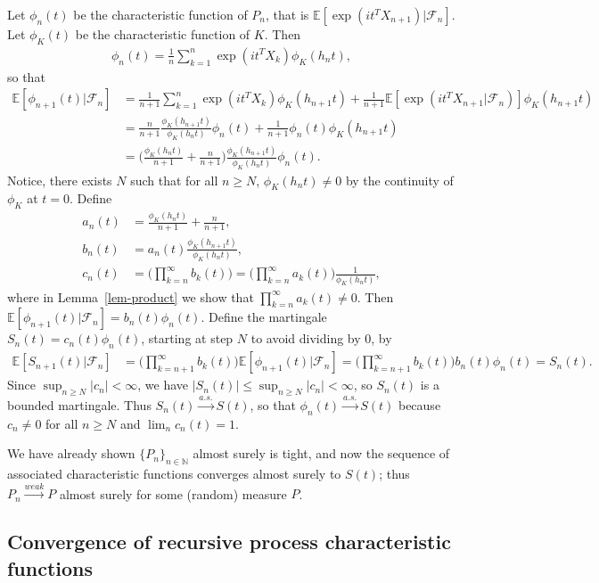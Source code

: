 \documentclass[12pt]{article}
\newcommand{\N}{\mathbb{N}}
\newcommand{\E}{\mathbb{E}}
\newcommand{\F}{\mathcal{F}}
\begin{document}
Let $\phi_n(t)$ be the characteristic function of $P_n$, that is $\E[\exp(it^TX_{n+1}) | \F_n]$. Let $\phi_K(t)$ be the characteristic function of $K$. Then
\begin{align*}
    \phi_n(t) = \frac{1}{n} \sum_{k = 1}^n \exp(it^T X_k) \phi_K(h_n t),
\end{align*}
so that
\begin{align*}
    \E[\phi_{n+1}(t) | \F_n] &= \frac{1}{n+1} \sum_{k = 1}^n \exp(it^T X_k) \phi_K(h_{n+1} t) + \frac{1}{n+ 1} \E[\exp(it^T X_{n+1} | \F_n)]\phi_K(h_{n+1}t) \\
    &= \frac{n}{n+1} \frac{\phi_K(h_{n+1} t)}{\phi_K(h_n t)} \phi_n(t) + \frac{1}{n+1} \phi_n(t) \phi_K(h_{n+1} t)\\
    &= \bigg(\frac{\phi_K(h_n t)}{n+1}  + \frac{n}{n+1}\bigg) \frac{\phi_K(h_{n+1}t)}{\phi_K(h_n t)} \phi_n(t).
\end{align*}
Notice, there exists $N$ such that for all $n \geq N$, $\phi_K(h_n t) \neq 0$ by the continuity of $\phi_K$ at $t = 0$. Define 
\begin{align*}
    a_n(t) &= \frac{\phi_K(h_n t)}{n+1}  + \frac{n}{n+1},\\
    b_n(t) &= a_n(t) \frac{\phi_K(h_{n+1}t)}{\phi_K(h_n t)}, \\
    c_n(t) &= \Big(\prod_{k = n}^{\infty} b_k(t)\Big) = \Big(\prod_{k = n}^{\infty} a_k(t)\Big) \frac{1}{\phi_K(h_n t)},
\end{align*}
where in Lemma~\ref{lem-product} we show that $\prod_{k = n}^{\infty} a_k(t) \neq  0$. Then $\E[\phi_{n+1}(t)|\F_n] = b_n(t) \phi_n(t)$.
Define the martingale $S_n(t) = c_n(t) \phi_n(t)$, starting at step $N$ to avoid dividing by $0$, by
\begin{align*}
    \E[S_{n + 1}(t) | \F_n] &= \Big(\prod_{k = n+1}^\infty b_k(t)\Big) \E[\phi_{n+1}(t) |\F_n] = \Big(\prod_{k = n+1}^\infty b_k(t)\Big) b_n(t)\phi_n(t) = S_n(t).
\end{align*}
Since $\sup_{n \geq N}|c_n| < \infty$, we have $|S_n(t)| \leq \sup_{n \geq N}|c_n| < \infty$, so $S_n(t)$ is a bounded martingale. Thus $S_n(t) \overset{a.s.}{\to} S(t)$, so that $\phi_n(t) \overset{a.s.} \to S(t)$ because $c_n \neq 0$ for all $n \geq N$ and $\lim_n c_n(t) = 1$.

We have already shown $\{P_n\}_{n \in \N}$ almost surely is tight, and now the sequence of associated characteristic functions converges almost surely to $S(t)$; thus $P_n \overset{weak}{\to} P$ almost surely for some (random) measure $P$.

\subsection{Convergence of recursive process characteristic functions}
\end{document}

